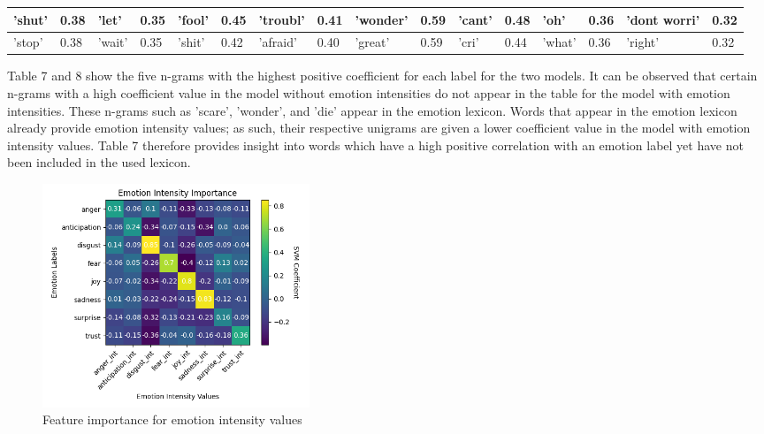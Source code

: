 \documentclass{icsthesis}
\begin{document}
\begin{mainmatter}
\begin{table}
{\begin{tabular}{|ll|ll|ll|ll|ll|ll|ll|ll|}
                    \multicolumn{1}{|l|}{'shut'} & 0.38        & \multicolumn{1}{l|}{'let'}  & 0.35       & \multicolumn{1}{l|}{'fool'} & 0.45        & \multicolumn{1}{l|}{'troubl'}    & 0.41        & \multicolumn{1}{l|}{'wonder'}  & 0.59        & \multicolumn{1}{l|}{'cant'} & 0.48        & \multicolumn{1}{l|}{'oh'}        & 0.36        & \multicolumn{1}{l|}{'dont worri'} & 0.32        \\ 
                    \hline
                    \multicolumn{1}{|l|}{'stop'} & 0.38        & \multicolumn{1}{l|}{'wait'} & 0.35       & \multicolumn{1}{l|}{'shit'}   & 0.42        & \multicolumn{1}{l|}{'afraid'}  & 0.40        & \multicolumn{1}{l|}{'great'}  & 0.59       & \multicolumn{1}{l|}{'cri'} & 0.44        & \multicolumn{1}{l|}{'what'}       & 0.36        & \multicolumn{1}{l|}{'right'}       & 0.32       \\ 
                    \hline
                    \end{tabular}%
                    }
                \end{table}
                
                Table 7 and 8 show the five n-grams with the highest positive coefficient for each label for the two models. It can be observed that certain n-grams with a high coefficient value in the model without emotion intensities do not appear in the table for the model with emotion intensities. These n-grams such as 'scare', 'wonder', and 'die' appear in the emotion lexicon. Words that appear in the emotion lexicon already provide emotion intensity values; as such, their respective unigrams are given a lower coefficient value in the model with emotion intensity values. Table 7 therefore provides insight into words which have a high positive correlation with an emotion label yet have not been included in the used lexicon.
                
                \begin{figure}[h!]
                    \centering
                    \includegraphics[width=8cm]{./images/emoimp.png}
                    \caption{Feature importance for emotion intensity values}
                    \label{fig:chart}
                \end{figure}
                

\end{mainmatter}
\end{document}
